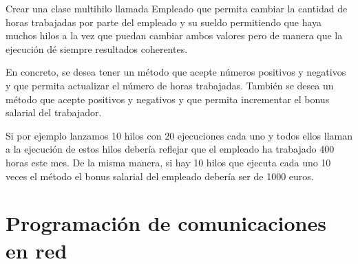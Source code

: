 \documentclass[letterpaper,10pt,spanish]{sphinxmanual}
\begin{document}
Crear una clase multihilo llamada Empleado que permita cambiar la cantidad de horas trabajadas por parte del empleado y su sueldo permitiendo que haya muchos hilos a la vez que puedan cambiar ambos valores pero de manera que la ejecución dé siempre resultados coherentes.

En concreto, se desea tener un método  que acepte números positivos y negativos y que permita actualizar el número de horas trabajadas. También se desea un método  que acepte positivos y negativos y que permita incrementar el bonus salarial del trabajador.

Si por ejemplo lanzamos 10 hilos con 20 ejecuciones cada uno y todos ellos llaman a  la ejecución de estos hilos debería reflejar que el empleado ha trabajado 400 horas este mes. De la misma manera, si hay 10 hilos que ejecuta cada uno 10 veces el método  el bonus salarial del empleado debería ser de 1000 euros.

\begin{sphinxVerbatim}[commandchars=\\\{\}]
   
         
         
            
            
\end{sphinxVerbatim}


\chapter{Programación de comunicaciones en red}
\label{\detokenize{textos/tema3:programacion-de-comunicaciones-en-red}}\label{\detokenize{textos/tema3::doc}}
\end{document}
